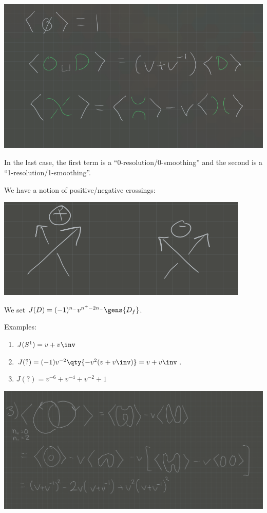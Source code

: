 \includegraphics{figures/image_2020-07-06-11-40-29.png}

In the last case, the first term is a ``0-resolution/0-smoothing'' and
the second is a ``1-resolution/1-smoothing''.

We have a notion of positive/negative crossings:

\includegraphics{figures/image_2020-07-06-11-44-50.png}

We set \(J(D) = (-1)^{n_-} v^{n^+ - 2n_-} \gens{D_f}\).

Examples:

\begin{enumerate}
\def\labelenumi{\arabic{enumi}.}
\item
  \(J(S^1) = v + v\inv\)
\item
  \(J(?) = (-1) v^{-2} \qty{ -v^2 (v+v\inv)} = v+v\inv\).
\item
  \(J(?) = v^{-6} + v^{-4} + v^{-2} + 1\)
\end{enumerate}

\includegraphics{figures/image_2020-07-06-11-50-40.png}

